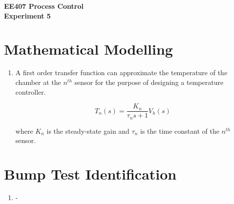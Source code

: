 \documentclass[a4paper,12pt]{article}
\begin{document}
\begin{center}
	\textbf{\large EE407 Process Control \\[0.2cm] Experiment 5} \\
\end{center}

\section{\large Mathematical Modelling}
	\begin{enumerate}
		\item A first order transfer function can approximate the temperature of the chamber at the $n^{th}$ sensor for the purpose of designing a temperature controller.
		
			$$ T_n(s)=\frac{K_n}{\tau_n s+1}V_h(s)$$
			
			where $K_n$ is the steady-state gain and $\tau_n$ is the time constant of the $n^{th}$ sensor.
	\end{enumerate}
	
\section{\large Bump Test Identification}
	\begin{enumerate}[resume]
		\item -
	\end{enumerate}
	
\end{document}
